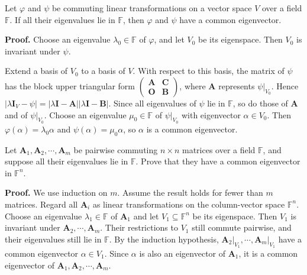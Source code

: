 \documentclass[12pt, a4paper, oneside]{book}
\begin{document}
\begin{corollary}
    Let $\varphi$ and $\psi$ be commuting linear transformations on a vector space $V$ over a field $\mathbb{F}$. If all their eigenvalues lie in $\mathbb{F}$, then $\varphi$ and $\psi$ have a common eigenvector.

    \textbf{Proof.}
    Choose an eigenvalue $\lambda_0 \in \mathbb{F}$ of $\varphi$, and let $V_0$ be its eigenspace. Then $V_0$ is invariant under ${\psi}$.

    Extend a basis of $V_0$ to a basis of $V$. With respect to this basis, the matrix of $\psi$ has the block upper triangular form $\left(\begin{array}{ll}\mathbf{A} & \mathbf{C} \\ \mathbf{O} & \mathbf{B}\end{array}\right)$, where $\mathbf{A}$ represents $\left.\psi\right|_{V_0}$. Hence $\left|\lambda \mathbf{I}_V-\psi\right|=|\lambda \mathbf{I}-\mathbf{A}||\lambda \mathbf{I}-\mathbf{B}|$. Since all eigenvalues of ${\psi}$ lie in $\mathbb{F}$, so do those of $\mathbf{A}$ and of $\left.{\psi}\right|_{V_0}$. Choose an eigenvalue $\mu_0 \in \mathbb{F}$ of $\left.{\psi}\right|_{V_0}$ with eigenvector ${\alpha} \in V_0$. Then ${\varphi}({\alpha})=\lambda_0 {\alpha}$ and ${\psi}({\alpha})=\mu_0 {\alpha}$, so ${\alpha}$ is a common eigenvector.
\end{corollary}
\begin{corollary}
    Let $\mathbf{A}_1, \mathbf{A}_2, \cdots, \mathbf{A}_m$ be pairwise commuting $n \times n$ matrices over a field $\mathbb{F}$, and suppose all their eigenvalues lie in $\mathbb{F}$. Prove that they have a common eigenvector in $\mathbb{F}^n$.

    \textbf{Proof.}
    We use induction on $m$. Assume the result holds for fewer than $m$ matrices. Regard all $\mathbf{A}_i$ as linear transformations on the column-vector space $\mathbb{F}^n$. Choose an eigenvalue $\lambda_1 \in \mathbb{F}$ of $\mathbf{A}_1$ and let $V_1 \subseteq \mathbb{F}^n$ be its eigenspace. Then $V_1$ is invariant under $\mathbf{A}_2, \cdots, \mathbf{A}_m$. Their restrictions to $V_1$ still commute pairwise, and their eigenvalues still lie in $\mathbb{F}$. By the induction hypothesis, $\left.\mathbf{A}_2\right|_{V_1}, \cdots,\left.\mathbf{A}_m\right|_{V_1}$ have a common eigenvector $\alpha \in V_1$. Since ${\alpha}$ is also an eigenvector of $\mathbf{A}_1$, it is a common eigenvector of $\mathbf{A}_1, \mathbf{A}_2, \cdots, \mathbf{A}_m$.
\end{corollary}
\end{document}
